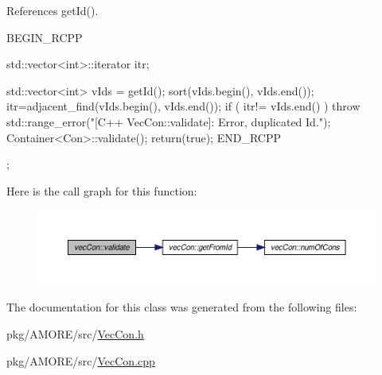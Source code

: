 References getId().


\begin{DoxyCode}
                      {
        BEGIN_RCPP

        std::vector<int>::iterator itr;

        std::vector<int> vIds = getId();
        sort(vIds.begin(), vIds.end());
        itr=adjacent_find(vIds.begin(), vIds.end());
        if ( itr!= vIds.end() )  throw std::range_error("[C++ VecCon::validate]: 
      Error, duplicated Id.");
        Container<Con>::validate();
        return(true);
        END_RCPP

};
\end{DoxyCode}


Here is the call graph for this function:
\nopagebreak
\begin{figure}[H]
\begin{center}
\leavevmode
\includegraphics[width=400pt]{classvec_con_a7dc281e7258bf8be19a1591501c5434d_cgraph}
\end{center}
\end{figure}




The documentation for this class was generated from the following files:\begin{DoxyCompactItemize}
\item 
pkg/AMORE/src/\hyperlink{vec_con_8h}{VecCon.h}\item 
pkg/AMORE/src/\hyperlink{vec_con_8cpp}{VecCon.cpp}\end{DoxyCompactItemize}
